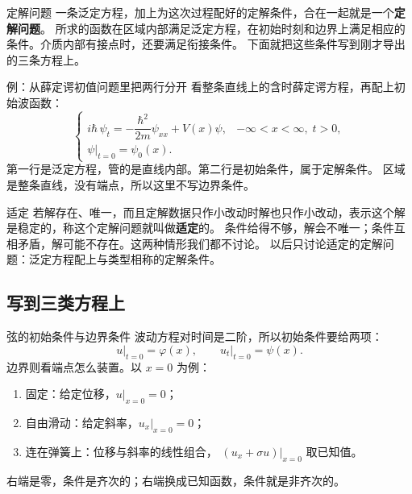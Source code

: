 \documentclass[fontset=windows, chinese, 10pt, xcolor=dvipsnames]{beamer}
\begin{document}
\begin{frame}{定解问题}
  一条泛定方程，加上为这次过程配好的定解条件，合在一起就是一个\textbf{定解问题}。
  \vspace{0.4em}
  所求的函数在区域内部满足泛定方程，在初始时刻和边界上满足相应的条件。介质内部有接点时，还要满足衔接条件。
  \vspace{0.35em}
  下面就把这些条件写到刚才导出的三条方程上。
\end{frame}

\begin{frame}{例：从薛定谔初值问题里把两行分开}
  看整条直线上的含时薛定谔方程，再配上初始波函数：
  \begin{equation*}
    \begin{cases}
      i\hbar\,\psi_t=-\dfrac{\hbar^2}{2m}\psi_{xx}+V(x)\psi,
        & -\infty<x<\infty,\; t>0,\\[4pt]
      \psi\big|_{t=0}=\psi_0(x).
    \end{cases}
  \end{equation*}
  第一行是泛定方程，管的是直线内部。第二行是初始条件，属于定解条件。
  \vspace{0.3em}
  区域是整条直线，没有端点，所以这里不写边界条件。
\end{frame}

\begin{frame}{适定}
  若解存在、唯一，而且定解数据只作小改动时解也只作小改动，表示这个解是稳定的，称这个定解问题就叫做\textbf{适定}的。%
  \vspace{0.4em}
  条件给得不够，解会不唯一；条件互相矛盾，解可能不存在。这两种情形我们都不讨论。
  \vspace{0.35em}
  以后只讨论适定的定解问题：泛定方程配上与类型相称的定解条件。%
\end{frame}

\subsection{写到三类方程上}

\begin{frame}{弦的初始条件与边界条件}
  波动方程对时间是二阶，所以初始条件要给两项：
  \begin{equation*}
    u\big|_{t=0}=\varphi(x),\qquad u_t\big|_{t=0}=\psi(x).
  \end{equation*}
  边界则看端点怎么装置。以 $x=0$ 为例：
  \begin{enumerate}
    \item[(I)] 固定：给定位移，$u|_{x=0}=0$；
    \item[(II)] 自由滑动：给定斜率，$u_x|_{x=0}=0$；
    \item[(III)] 连在弹簧上：位移与斜率的线性组合，
      $(u_x+\sigma u)|_{x=0}$ 取已知值。
  \end{enumerate}
  右端是零，条件是齐次的；右端换成已知函数，条件就是非齐次的。
\end{frame}
\end{document}
